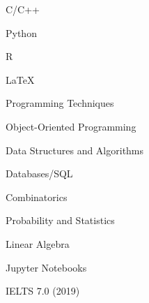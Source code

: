 \documentclass[11pt]{spidercv}
\begin{document}
    \begin{SideBar}{\ColorBackground}{\ColorTextSide}
        
        
        
        \vspace*{1cm}
        
        \begin{ItemList}{\ColorHighlight}
            \item [\faCode] C/C++
            \item [\faCode] Python
            \item [\faCode] R
            \item [\faCode] \LaTeX
        \end{ItemList}
        
        \vspace*{1cm}

        \begin{ItemList}{\ColorHighlight}
            \item [\faPencilSquareO] Programming Techniques
            \item [\faPencilSquareO] Object-Oriented Programming
            \item [\faPencilSquareO] Data Structures and Algorithms
            \item [\faPencilSquareO] Databases/SQL
            \item [\faPencilSquareO] Combinatorics
            \item [\faPencilSquareO] Probability and Statistics
            \item [\faPencilSquareO] Linear Algebra
            \item [\faPencilSquareO] Jupyter Notebooks
        \end{ItemList}

        \vspace*{1cm}


        \begin{SkillGauges}{\ColorHighlight}
            IELTS 7.0 (2019)
        \end{SkillGauges}
    \end{SideBar}
\end{document}
